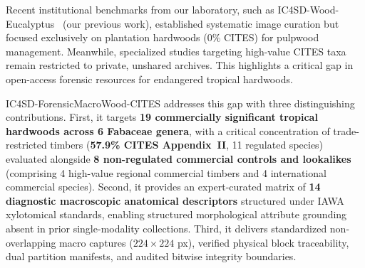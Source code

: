 \documentclass[a4paper,fleqn,12pt]{cas-sc}
\begin{document}
Recent institutional benchmarks from our laboratory, such as IC4SD-Wood-Eucalyptus~\cite{nguyentrong2026eucalyptus} (our previous work), established systematic image curation but focused exclusively on plantation hardwoods ($0\%$ CITES) for pulpwood management. Meanwhile, specialized studies targeting high-value CITES taxa~\cite{liu2025} remain restricted to private, unshared archives. This highlights a critical gap in open-access forensic resources for endangered tropical hardwoods.

IC4SD-ForensicMacroWood-CITES addresses this gap with three distinguishing contributions. First, it targets \textbf{19 commercially significant tropical hardwoods across 6 Fabaceae genera}, with a critical concentration of trade-restricted timbers (\textbf{57.9\% CITES Appendix~II}, 11 regulated species) evaluated alongside \textbf{8 non-regulated commercial controls and lookalikes} (comprising 4 high-value regional commercial timbers and 4 international commercial species). Second, it provides an expert-curated matrix of \textbf{14 diagnostic macroscopic anatomical descriptors} structured under IAWA xylotomical standards, enabling structured morphological attribute grounding absent in prior single-modality collections. Third, it delivers standardized non-overlapping macro captures ($224 \times 224$ px), verified physical block traceability, dual partition manifests, and audited bitwise integrity boundaries.
\end{document}
